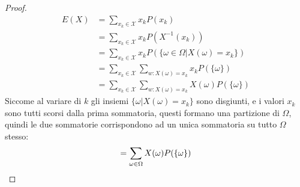 \documentclass{article}
\theoremstyle{plain}
\theoremstyle{definition}
\theoremstyle{remark}
\begin{document}
\begin{proof}
	\begin{align*}
		E(X)&=\sum_{x_k\in\mathcal{X}}x_kP(x_k)\\
		&=\sum_{x_k\in\mathcal{X}}x_kP(X^{-1}(x_k))\\
		&=\sum_{x_k\in\mathcal{X}}x_kP(\{\omega\in\Omega|X(\omega)=x_k\})\\
		&=\sum_{x_k\in\mathcal{X}}\sum_{w:X(\omega)=x_k}x_kP(\{\omega\})\\
		&=\sum_{x_k\in\mathcal{X}}\sum_{w:X(\omega)=x_k}X(\omega)P(\{\omega\})
	\end{align*}
	Siccome al variare di $k$ gli insiemi $\{\omega|X(\omega)=x_k\}$ sono disgiunti, e i valori $x_k$ sono tutti scorsi dalla prima sommatoria, questi formano una partizione di $\Omega$, quindi le due sommatorie corrispondono ad un unica sommatoria su tutto $\Omega$ stesso:
	\begin{equation*}
		=\sum_{\omega\in\Omega}X(\omega)P(\{\omega\})\qedhere
	\end{equation*}
\end{proof}
\end{document}
